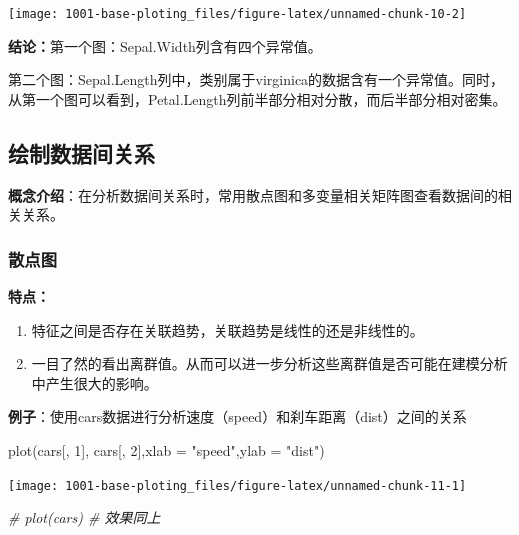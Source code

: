 \documentclass[
]{book}
\newenvironment{Shaded}{\begin{snugshade}}{\end{snugshade}}
\newcommand{\AttributeTok}[1]{\textcolor[rgb]{0.77,0.63,0.00}{#1}}
\newcommand{\CommentTok}[1]{\textcolor[rgb]{0.56,0.35,0.01}{\textit{#1}}}
\newcommand{\DecValTok}[1]{\textcolor[rgb]{0.00,0.00,0.81}{#1}}
\newcommand{\FunctionTok}[1]{\textcolor[rgb]{0.00,0.00,0.00}{#1}}
\newcommand{\NormalTok}[1]{#1}
\newcommand{\StringTok}[1]{\textcolor[rgb]{0.31,0.60,0.02}{#1}}
\begin{document}
\begin{center}\texttt{[image: 1001-base-ploting\_files/figure-latex/unnamed-chunk-10-2]} \end{center}

\textbf{结论：}第一个图：Sepal.Width列含有四个异常值。

第二个图：Sepal.Length列中，类别属于virginica的数据含有一个异常值。同时，从第一个图可以看到，Petal.Length列前半部分相对分散，而后半部分相对密集。

\hypertarget{ux7ed8ux5236ux6570ux636eux95f4ux5173ux7cfb}{%
\subsection{绘制数据间关系}\label{ux7ed8ux5236ux6570ux636eux95f4ux5173ux7cfb}}

\textbf{概念介绍}：在分析数据间关系时，常用散点图和多变量相关矩阵图查看数据间的相关关系。

\hypertarget{ux6563ux70b9ux56fe}{%
\subsubsection{散点图}\label{ux6563ux70b9ux56fe}}

\textbf{特点：}

\begin{enumerate}
\def\labelenumi{(\arabic{enumi})}
\item
  特征之间是否存在关联趋势，关联趋势是线性的还是非线性的。
\item
  一目了然的看出离群值。从而可以进一步分析这些离群值是否可能在建模分析中产生很大的影响。
\end{enumerate}

\textbf{例子}：使用cars数据进行分析速度（speed）和刹车距离（dist）之间的关系

\begin{Shaded}
\begin{Highlighting}[]
\FunctionTok{plot}\NormalTok{(cars[, }\DecValTok{1}\NormalTok{], cars[, }\DecValTok{2}\NormalTok{],}\AttributeTok{xlab =} \StringTok{"speed"}\NormalTok{,}\AttributeTok{ylab =} \StringTok{"dist"}\NormalTok{)}
\end{Highlighting}
\end{Shaded}

\begin{center}\texttt{[image: 1001-base-ploting\_files/figure-latex/unnamed-chunk-11-1]} \end{center}

\begin{Shaded}
\begin{Highlighting}[]
\CommentTok{\# plot(cars)  \# 效果同上}
\end{Highlighting}
\end{Shaded}
\end{document}

